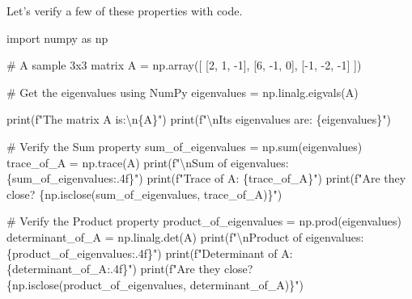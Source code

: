 \documentclass[
  letterpaper,
  DIV=11,
  numbers=noendperiod]{scrreprt}
\newenvironment{Shaded}{\begin{snugshade}}{\end{snugshade}}
\newcommand{\BuiltInTok}[1]{\textcolor[rgb]{0.00,0.23,0.31}{#1}}
\newcommand{\CharTok}[1]{\textcolor[rgb]{0.13,0.47,0.30}{#1}}
\newcommand{\CommentTok}[1]{\textcolor[rgb]{0.37,0.37,0.37}{#1}}
\newcommand{\DecValTok}[1]{\textcolor[rgb]{0.68,0.00,0.00}{#1}}
\newcommand{\ImportTok}[1]{\textcolor[rgb]{0.00,0.46,0.62}{#1}}
\newcommand{\NormalTok}[1]{\textcolor[rgb]{0.00,0.23,0.31}{#1}}
\newcommand{\OperatorTok}[1]{\textcolor[rgb]{0.37,0.37,0.37}{#1}}
\newcommand{\SpecialCharTok}[1]{\textcolor[rgb]{0.37,0.37,0.37}{#1}}
\newcommand{\SpecialStringTok}[1]{\textcolor[rgb]{0.13,0.47,0.30}{#1}}
\begin{document}
Let's verify a few of these properties with code.

\label{verify-properties}
\begin{Shaded}
\begin{Highlighting}[]
\ImportTok{import}\NormalTok{ numpy }\ImportTok{as}\NormalTok{ np}

\CommentTok{\# A sample 3x3 matrix}
\NormalTok{A }\OperatorTok{=}\NormalTok{ np.array([}
\NormalTok{    [}\DecValTok{2}\NormalTok{, }\DecValTok{1}\NormalTok{, }\OperatorTok{{-}}\DecValTok{1}\NormalTok{],}
\NormalTok{    [}\DecValTok{6}\NormalTok{, }\OperatorTok{{-}}\DecValTok{1}\NormalTok{, }\DecValTok{0}\NormalTok{],}
\NormalTok{    [}\OperatorTok{{-}}\DecValTok{1}\NormalTok{, }\OperatorTok{{-}}\DecValTok{2}\NormalTok{, }\OperatorTok{{-}}\DecValTok{1}\NormalTok{]}
\NormalTok{])}

\CommentTok{\# Get the eigenvalues using NumPy}
\NormalTok{eigenvalues }\OperatorTok{=}\NormalTok{ np.linalg.eigvals(A)}

\BuiltInTok{print}\NormalTok{(}\SpecialStringTok{f"The matrix A is:}\CharTok{\textbackslash{}n}\SpecialCharTok{\{}\NormalTok{A}\SpecialCharTok{\}}\SpecialStringTok{"}\NormalTok{)}
\BuiltInTok{print}\NormalTok{(}\SpecialStringTok{f"}\CharTok{\textbackslash{}n}\SpecialStringTok{Its eigenvalues are: }\SpecialCharTok{\{}\NormalTok{eigenvalues}\SpecialCharTok{\}}\SpecialStringTok{"}\NormalTok{)}

\CommentTok{\# Verify the Sum property}
\NormalTok{sum\_of\_eigenvalues }\OperatorTok{=}\NormalTok{ np.}\BuiltInTok{sum}\NormalTok{(eigenvalues)}
\NormalTok{trace\_of\_A }\OperatorTok{=}\NormalTok{ np.trace(A)}
\BuiltInTok{print}\NormalTok{(}\SpecialStringTok{f"}\CharTok{\textbackslash{}n}\SpecialStringTok{Sum of eigenvalues: }\SpecialCharTok{\{}\NormalTok{sum\_of\_eigenvalues}\SpecialCharTok{:.4f\}}\SpecialStringTok{"}\NormalTok{)}
\BuiltInTok{print}\NormalTok{(}\SpecialStringTok{f"Trace of A: }\SpecialCharTok{\{}\NormalTok{trace\_of\_A}\SpecialCharTok{\}}\SpecialStringTok{"}\NormalTok{)}
\BuiltInTok{print}\NormalTok{(}\SpecialStringTok{f"Are they close? }\SpecialCharTok{\{}\NormalTok{np}\SpecialCharTok{.}\NormalTok{isclose(sum\_of\_eigenvalues, trace\_of\_A)}\SpecialCharTok{\}}\SpecialStringTok{"}\NormalTok{)}

\CommentTok{\# Verify the Product property}
\NormalTok{product\_of\_eigenvalues }\OperatorTok{=}\NormalTok{ np.prod(eigenvalues)}
\NormalTok{determinant\_of\_A }\OperatorTok{=}\NormalTok{ np.linalg.det(A)}
\BuiltInTok{print}\NormalTok{(}\SpecialStringTok{f"}\CharTok{\textbackslash{}n}\SpecialStringTok{Product of eigenvalues: }\SpecialCharTok{\{}\NormalTok{product\_of\_eigenvalues}\SpecialCharTok{:.4f\}}\SpecialStringTok{"}\NormalTok{)}
\BuiltInTok{print}\NormalTok{(}\SpecialStringTok{f"Determinant of A: }\SpecialCharTok{\{}\NormalTok{determinant\_of\_A}\SpecialCharTok{:.4f\}}\SpecialStringTok{"}\NormalTok{)}
\BuiltInTok{print}\NormalTok{(}\SpecialStringTok{f"Are they close? }\SpecialCharTok{\{}\NormalTok{np}\SpecialCharTok{.}\NormalTok{isclose(product\_of\_eigenvalues, determinant\_of\_A)}\SpecialCharTok{\}}\SpecialStringTok{"}\NormalTok{)}
\end{Highlighting}
\end{Shaded}
\end{document}
